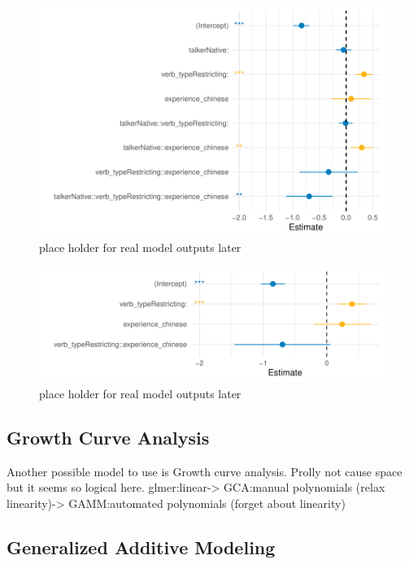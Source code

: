 \begin{figure}[h]
    \centering
    \includegraphics[width=\textwidth]{figures/GLMER_base_model.pdf}
    \caption{place holder for real model outputs later}
    \label{fig:model_outputs}
\end{figure}

\begin{figure}[h]
    \centering
    \includegraphics[width=\textwidth]{figures/GLMER_accent_model.pdf}
    \caption{place holder for real model outputs later}
    \label{fig:model_outputs}
\end{figure}

\subsection{Growth Curve Analysis}

Another possible model to use is Growth curve analysis. Prolly not cause space but it seems so logical here. glmer:linear-> GCA:manual polynomials (relax linearity)-> GAMM:automated polynomials (forget about linearity)


\subsection{Generalized Additive Modeling}

